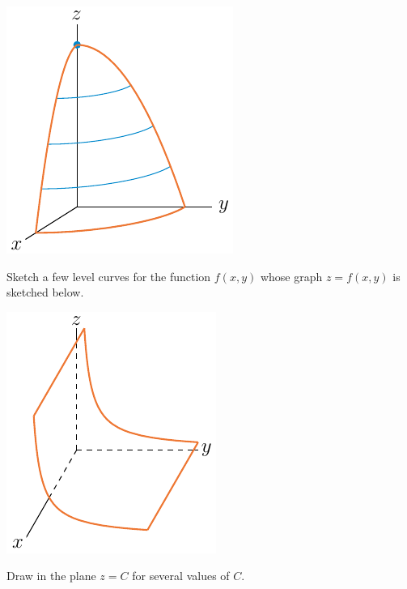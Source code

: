 \begin{solution}
\begin{center}
  \includegraphics{fig/paraboloidGraphB.pdf}
\end{center}


\end{solution}


\begin{question}
Sketch a few level curves for the function $f(x,y)$ whose graph $z=f(x,y)$
is sketched below.
\begin{center}
  \includegraphics{fig/hyperCylinderGraph.pdf}
\end{center}
\end{question}

\begin{hint}
Draw in the plane $z=C$ for several values of $C$. 
\end{hint}


